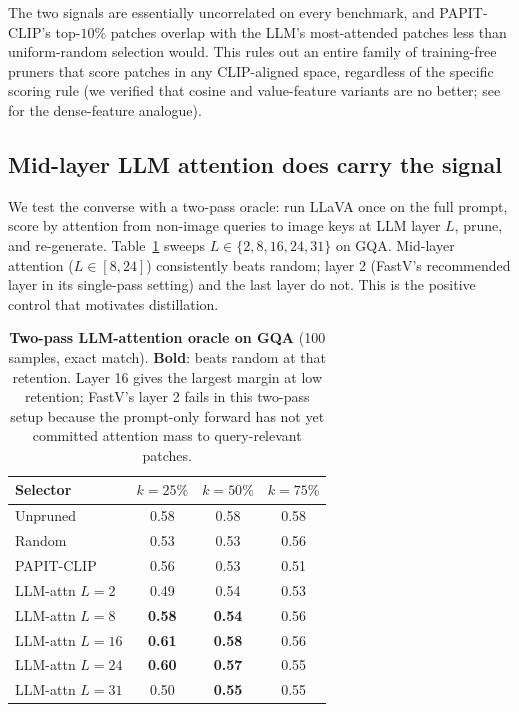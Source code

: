 \documentclass[10pt,twocolumn,letterpaper]{article}
\begin{document}
The two signals are essentially uncorrelated on every benchmark, and
PAPIT-CLIP's top-$10\%$ patches overlap with the LLM's most-attended
patches less than uniform-random selection would. This rules out an
entire family of training-free pruners that score patches in any
CLIP-aligned space, regardless of the specific scoring rule (we
verified that cosine and value-feature variants are no better;
see~\cite{zhou2022maskclip} for the dense-feature analogue).

\subsection{Mid-layer LLM attention does carry the signal}
\label{sec:results-oracle}

We test the converse with a two-pass oracle: run LLaVA once on the
full prompt, score by attention from non-image queries to image keys at
LLM layer $L$, prune, and re-generate. Table~\ref{tab:oracle} sweeps
$L\!\in\!\{2,8,16,24,31\}$ on GQA. Mid-layer attention
($L\!\in\![8,24]$) consistently beats random; layer 2 (FastV's
recommended layer in its single-pass setting) and the last layer do not.
This is the positive control that motivates distillation.

\begin{table}[t]
\centering
\small
\caption{\textbf{Two-pass LLM-attention oracle on GQA} (100 samples,
exact match). \textbf{Bold}: beats random at that retention. Layer 16
gives the largest margin at low retention; FastV's layer 2 fails in this
two-pass setup because the prompt-only forward has not yet committed
attention mass to query-relevant patches.}
\label{tab:oracle}
\begin{tabular}{@{}lccc@{}}
\toprule
Selector & $k{=}25\%$ & $k{=}50\%$ & $k{=}75\%$ \\
\midrule
Unpruned             & 0.58 & 0.58 & 0.58 \\
Random               & 0.53 & 0.53 & 0.56 \\
PAPIT-CLIP           & 0.56 & 0.53 & 0.51 \\
\midrule
LLM-attn $L\!=\!2$  & 0.49 & 0.54 & 0.53 \\
LLM-attn $L\!=\!8$  & \textbf{0.58} & \textbf{0.54} & 0.56 \\
LLM-attn $L\!=\!16$ & \textbf{0.61} & \textbf{0.58} & 0.56 \\
LLM-attn $L\!=\!24$ & \textbf{0.60} & \textbf{0.57} & 0.55 \\
LLM-attn $L\!=\!31$ & 0.50 & \textbf{0.55} & 0.55 \\
\bottomrule
\end{tabular}
\end{table}
\end{document}
